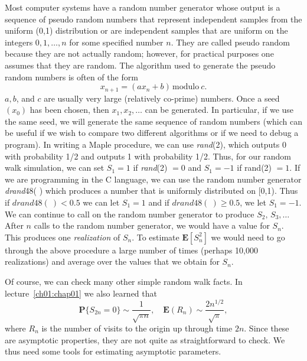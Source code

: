 \documentclass{stml-l}
\theoremstyle{definition}
\numberwithin{equation}{chapter}
\numberwithin{figure}{chapter}
\numberwithin{figure}{section}
\begin{document}
Most computer systems have a random number generator whose output is
a sequence of pseudo random numbers that represent independent
samples from the uniform (0,1) distribution or are independent
samples that are uniform on the integers $0,1,\ldots,n$ for some
specified number $n$. They are called pseudo random because they are
not actually random; however, for practical purposes one assumes
that they are random. The algorithm used to generate the pseudo
random numbers is often of the form
\begin{equation*}
x_{n+1}=(ax_{n}+b)\, \mathrm{modulo}\ c.
\end{equation*}
$a,b$, and $c$ are usually very large (relatively co-prime) numbers.
Once a seed $(x_{0})$ has been chosen, then $x_{1},x_{2},\ldots$ can
be generated. In particular, if we use the same seed, we will
generate the same sequence of random numbers (which can be useful if
we wish to compare two different algorithms or if we need to debug a
program). In writing a Maple procedure, we can use \emph{rand}(2),
which outputs $0$ with probability 1/2 and outputs 1 with
probability 1/2. Thus, for our random walk simulation, we can set
$S_{1}=1$ if \emph{rand}(2) $=0$ and $S_{1}=-1$ if rand(2) $=1$. If
we are programming in the C language, we can use the random number
generator \emph{drand}48( ) which produces a number that is uniformly
distributed on [0,1). Thus if $drand48(\ )<0.5$ we can let $S_{1}=1$
and if $drand48(\ )\geq 0.5$, we let $S_{1}=-1$. We can continue to
call on the random number generator to produce $S_{2},\,S_{3},\ldots$
After $n$ calls to the random number generator, we would have a
value for $S_{n}$. This produces one \emph{realization} of $S_{n}$.
To estimate $\mathbf{E}[S_{n}^{2}]$ we would need to go through the
above procedure a large number of times (perhaps 10,000
realizations) and average over the values that we obtain for
$S_{n}$.

Of course, we can check many other simple random walk facts. In
lecture~\ref{ch01:chap01} we also learned that
\begin{equation*}
\mathbf{P}\{S_{2n}=0\}\sim\frac{1}{\sqrt{\pi
n}},\quad\mathbf{E}(R_{n})\sim\frac{2n^{1/2}}{\sqrt{\pi}},
\end{equation*}
where $R_{n}$ is the number of visits to the origin up through time
$2n$. Since these are asymptotic properties, they are not quite as
straightforward to check. We thus need some tools for estimating
asymptotic parameters.
\end{document}
